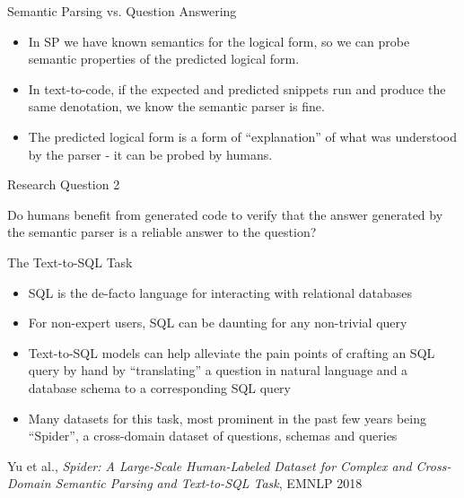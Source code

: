 \documentclass{beamer}
\begin{document}
\begin{frame}{Semantic Parsing vs. Question Answering}
    \begin{itemize}
        \item In SP we have known semantics for the logical form, so we can probe semantic properties of the predicted logical form.

        \pause

        \item In text-to-code, if the expected and predicted snippets run and produce the same denotation, we know the semantic parser is fine.

        \pause

        \item The predicted logical form is a form of ``explanation'' of what was understood by the parser - it can be probed by humans.
    \end{itemize}
\end{frame}

\begin{frame}{Research Question 2}
    \begin{center}
        Do humans benefit from generated code to verify that the answer generated by the semantic parser is a reliable answer to the question?
    \end{center}
\end{frame}

\begin{frame}{The Text-to-SQL Task}
    \begin{itemize}
        \item SQL is the de-facto language for interacting with relational databases
        \item For non-expert users, SQL can be daunting for any non-trivial query
        \item Text-to-SQL models can help alleviate the pain points of crafting an SQL query by hand by ``translating'' a question in natural language and a database schema to a corresponding SQL query
        \item Many datasets for this task, most prominent in the past few years being ``Spider'', a cross-domain dataset of questions, schemas and queries
    \end{itemize}

    \vfill

    \tiny{Yu et al., \emph{Spider: A Large-Scale Human-Labeled Dataset for Complex and Cross-Domain Semantic Parsing and Text-to-SQL Task}, EMNLP 2018}
\end{frame}
\end{document}
